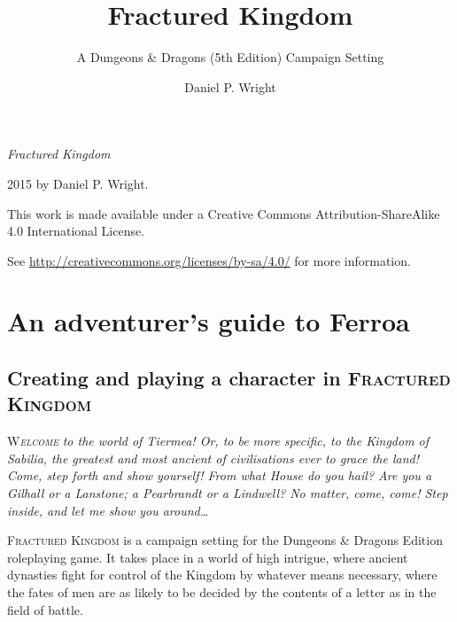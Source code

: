 \documentclass[10pt,twoside,openright,a4paper,twocolumn]{book}
\title{Fractured Kingdom}
\subtitle{A Dungeons \& Dragons (5th Edition) Campaign Setting}
\author{Daniel P. Wright}
\begin{document}

\begin{titlingpage}
\factionstitle
\end{titlingpage}
\restoregeometry

\frontmatter
{}

\onecolumn
\thispagestyle{empty}
\null\vfill
\begin{flushleft}
\textit{Fractured Kingdom}

{\textcopyright} 2015 by Daniel P. Wright.

\bigskip

{\ccLogo} {\ccAttribution} {\ccShareAlike}

This work is made available under a Creative Commons Attribution-ShareAlike 4.0 International License.

See \url{http://creativecommons.org/licenses/by-sa/4.0/} for more information.
\end{flushleft}
\twocolumn

\cleardoublepage

\tableofcontents

\thispagestyle{empty}

\mainmatter

\part{An adventurer's guide to Ferroa}

\chapter{Creating and playing a character in \textsc{Fractured Kingdom}}
\label{chap:character-creation}

\lettrine{W}{\textit{elcome}} \textit{to the world of Tiermea! Or, to be more
specific, to the Kingdom of Sabilia, the greatest and most ancient of
civilisations ever to grace the land!  Come, step forth and show yourself!
From what House do you hail?  Are you a Gilhall or a Lanstone; a Pearbrandt or
a Lindwell?  No matter, come, come!  Step inside, and let me show you
around\dots}

\textsc{Fractured Kingdom} is a campaign setting for the Dungeons \& Dragons
 Edition roleplaying game.  It takes place in a world of high
intrigue, where ancient dynasties fight for control of the Kingdom by whatever
means necessary, where the fates of men are as likely to be decided by the
contents of a letter as in the field of battle.
\end{document}
